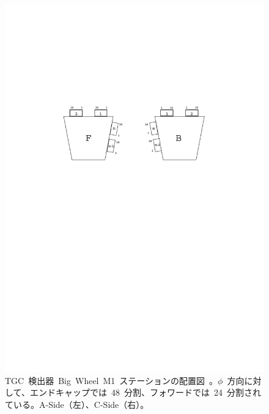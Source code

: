 \begin{figure}[H]
\begin{minipage}{0.49\hsize}
        \includegraphics[width=\textwidth,page=3]{img/pdf/TGC.pdf}
        \end{minipage}
        \caption[TGC 検出器~Big~Wheel~M1~ステーションの配置図]{TGC~検出器~Big~Wheel~M1~ステーションの配置図~\cite{TR:02}。$\phi$~方向に対して、エンドキャップでは~48~分割、フォワードでは~24~分割されている。A-Side（左）、C-Side（右）。}
        \label{fig:tgcBW}
\end{figure}

